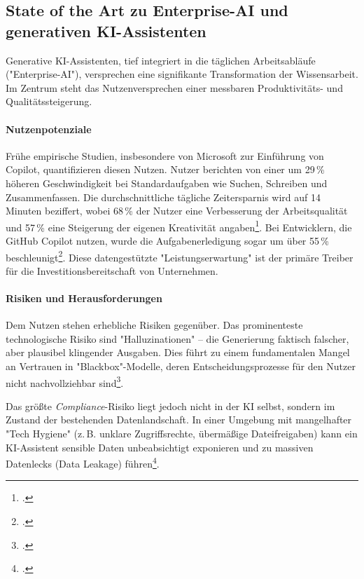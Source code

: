 \documentclass[12pt,a4paper,oneside]{article} %
\begin{document}
\subsection{State of the Art zu Enterprise-AI und generativen KI-Assistenten}
Generative KI-Assistenten, tief integriert in die täglichen Arbeitsabläufe ("Enterprise-AI"), versprechen eine signifikante Transformation der Wissensarbeit. Im Zentrum steht das Nutzenversprechen einer messbaren Produktivitäts- und Qualitätssteigerung.

\paragraph{Nutzenpotenziale}
Frühe empirische Studien, insbesondere von Microsoft zur Einführung von Copilot, quantifizieren diesen Nutzen. Nutzer berichten von einer um 29\,\% höheren Geschwindigkeit bei Standardaufgaben wie Suchen, Schreiben und Zusammenfassen. Die durchschnittliche tägliche Zeitersparnis wird auf 14 Minuten beziffert, wobei 68\,\% der Nutzer eine Verbesserung der Arbeitsqualität und 57\,\% eine Steigerung der eigenen Kreativität angaben\footcite{Microsoft2025Worklab}. Bei Entwicklern, die GitHub Copilot nutzen, wurde die Aufgabenerledigung sogar um über 55\,\% beschleunigt\footcite{Arxiv2023GitHubImpact}. Diese datengestützte "Leistungserwartung" ist der primäre Treiber für die Investitionsbereitschaft von Unternehmen.

\paragraph{Risiken und Herausforderungen}
Dem Nutzen stehen erhebliche Risiken gegenüber. Das prominenteste technologische Risiko sind "Halluzinationen" – die Generierung faktisch falscher, aber plausibel klingender Ausgaben. Dies führt zu einem fundamentalen Mangel an Vertrauen in "Blackbox"-Modelle, deren Entscheidungsprozesse für den Nutzer nicht nachvollziehbar sind\footcite{CyberSecurityIntel2025EmployeeResistance}.

Das größte \textit{Compliance}-Risiko liegt jedoch nicht in der KI selbst, sondern im Zustand der bestehenden Datenlandschaft. In einer Umgebung mit mangelhafter "Tech Hygiene" (z.\,B. unklare Zugriffsrechte, übermäßige Dateifreigaben) kann ein KI-Assistent sensible Daten unbeabsichtigt exponieren und zu massiven Datenlecks (Data Leakage) führen\footcite{MicrosoftLearn2025CopilotSecurity}.
\end{document}
